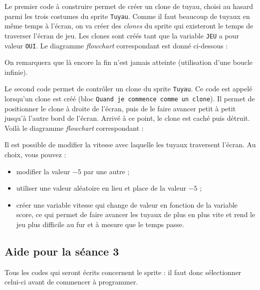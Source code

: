 Le premier code à construire permet de créer un clone de tuyau, choisi au hasard parmi les trois costumes du sprite \texttt{Tuyau}. Comme il faut beaucoup de tuyaux en même temps à l'écran, on va créer des \emph{clones} du sprite qui existeront le temps de traverser l'écran de jeu. Les clones sont créés tant que la variable \texttt{JEU} a pour valeur \texttt{OUI}. Le diagramme \emph{flowchart} correspondant est donné ci-dessous :



On remarquera que là encore la fin n'est jamais atteinte (utilisation d'une boucle infinie).

Le second code permet de contrôler un clone du sprite \texttt{Tuyau}. Ce code est appelé lorsqu'un clone est créé (bloc \texttt{Quand je commence comme un clone}). Il permet de positionner le clone à droite de l'écran, puis de le faire avancer petit à petit jusqu'à l'autre bord de l'écran. Arrivé à ce point, le clone est caché puis détruit. Voilà le diagramme \emph{flowchart} correspondant :



Il est possible de modifier la vitesse avec laquelle les tuyaux traversent l'écran. Au choix, vous pouvez :
\begin{itemize}
\item modifier la valeur $-5$ par une autre ;
\item utiliser une valeur aléatoire en lieu et place de la valeur $-5$ ;
\item créer une variable vitesse qui change de valeur en fonction de la variable score, ce qui permet de faire avancer les tuyaux de plus en plus vite et rend le jeu plus difficile au fur et à mesure que le temps passe.
\end{itemize}



\subsection{Aide pour la séance 3}\label{aide_seanceScratch3}


Tous les codes qui seront écrits concernent le sprite : il faut donc sélectionner celui-ci avant de commencer à programmer.

\vspace{6pt}


